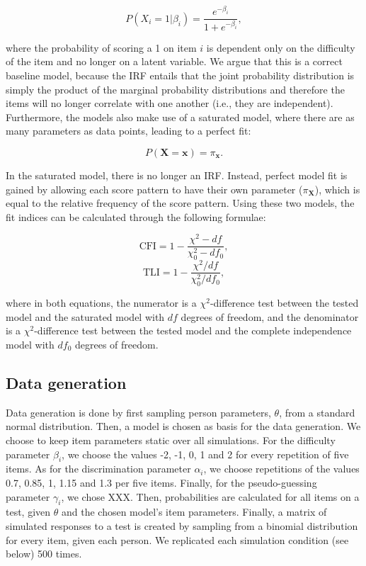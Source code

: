 \documentclass[Royal,sageapa,times,doublespace]{sagej}
\begin{document}
\begin{equation}
P(X_i = 1 | \beta_{i}) = \frac{e^{- \beta_{i}}}{1 + e^{- \beta_{i}}},
\end{equation}

where the probability of scoring a 1 on item $i$ is dependent only on the difficulty of the item and no longer on a latent variable. We argue that this is a correct baseline model, because the IRF entails that the joint probability distribution is simply the product of the marginal probability distributions and therefore the items will no longer correlate with one another (i.e., they are independent). Furthermore, the models also make use of a saturated model, where there are as many parameters as data points, leading to a perfect fit:

\begin{equation}
P(\boldsymbol{X} = \boldsymbol{x}) = \pi_{\boldsymbol{x}}.
\end{equation}

In the saturated model, there is no longer an IRF. Instead, perfect model fit is gained by allowing each score pattern to have their own parameter ($\pi_{\boldsymbol{X}}$), which is equal to the relative frequency of the score pattern. Using these two models, the fit indices can be calculated through the following formulae:

\begin{equation}
\text{CFI} = 1 - \frac{\chi^{2} - df}{\chi^{2}_{0} - df_0},
\end{equation}
\begin{equation}
\text{TLI} = 1 - \frac{\chi^{2}/df}{\chi^{2}_{0}/df_0},
\end{equation}

where in both equations, the numerator is a $\chi^2$-difference test between the tested model and the saturated model with $df$ degrees of freedom, and the denominator is a $\chi^2$-difference test between the tested model and the complete independence model with $df_0$ degrees of freedom.

\subsection{Data generation}
Data generation is done by first sampling person parameters, $\theta$, from a standard normal distribution. Then, a model is chosen as basis for the data generation. We choose to keep item parameters static over all simulations. For the difficulty parameter $\beta_i$, we choose the values -2, -1, 0, 1 and 2 for every repetition of five items. As for the discrimination parameter $\alpha_i$, we choose repetitions of the values 0.7, 0.85, 1, 1.15 and 1.3 per five items. Finally, for the pseudo-guessing parameter $\gamma_i$, we chose XXX. Then, probabilities are calculated for all items on a test, given $\theta$ and the chosen model's item parameters. Finally, a matrix of simulated responses to a test is created by sampling from a binomial distribution for every item, given each person. We replicated each simulation condition (see below) 500 times.
\end{document}
